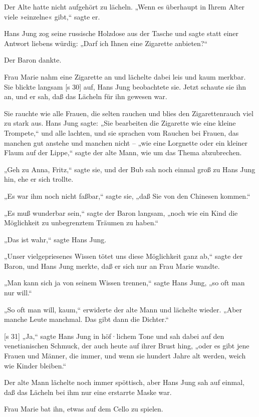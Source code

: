 Der Alte hatte nicht aufgehört zu lächeln.
„Wenn es überhaupt in Ihrem Alter viele »einzelne«
gibt,“ sagte er.

Hans Jung zog seine russische Holzdose aus
der Tasche und sagte statt einer Antwort liebens­
würdig: „Darf ich Ihnen eine Zigarette anbieten?“

Der Baron dankte.

Frau Marie nahm eine Zigarette an und lächelte
dabei leis und kaum merkbar. Sie blickte langsam
[s 30]
auf, Hans Jung beobachtete sie. Jetzt schaute sie ihn
an, und er sah, daß das Lächeln für ihn gewesen war.

Sie rauchte wie alle Frauen, die selten rauchen
und blies den Zigarettenrauch viel zu stark aus.
Hans Jung sagte: „Sie bearbeiten die Zigarette wie
eine kleine Trompete,“ und alle lachten, und sie
sprachen vom Rauchen bei Frauen, das manchen gut
anstehe und manchen nicht – „wie eine Lorgnette
oder ein kleiner Flaum auf der Lippe,“ sagte der
alte Mann, wie um das Thema abzubrechen.

„Geh zu Anna, Fritz,“ sagte sie, und der Bub sah
noch einmal groß zu Hans Jung hin, ehe er sich trollte.

„Es war ihm noch nicht faßbar,“ sagte sie, „daß
Sie von den Chinesen kommen.“

„Es muß wunderbar sein,“ sagte der Baron
langsam, „noch wie ein Kind die Möglichkeit zu
unbegrenztem Träumen zu haben.“

„Das ist wahr,“ sagte Hans Jung.

„Unser vielgepriesenes Wissen tötet uns diese
Möglichkeit ganz ab,“ sagte der Baron, und Hans
Jung merkte, daß er sich nur an Frau Marie wandte.

„Man kann sich ja von seinem Wissen trennen,“
sagte Hans Jung, „so oft man nur will.“

„So oft man will, kaum,“ erwiderte der alte
Mann und lächelte wieder. „Aber manche Leute
manchmal. Das gibt dann die Dichter.“

[s 31]
„Ja,“ sagte Hans Jung in höf·lichem Tone und
sah dabei auf den venetianischen Schmuck, der auch
heute auf ihrer Brust hing, „oder es gibt jene Frauen
und Männer, die immer, und wenn sie hundert Jahre
alt werden, weich wie Kinder bleiben.“

Der alte Mann lächelte noch immer spöttisch,
aber Hans Jung sah auf einmal, daß das Lächeln
bei ihm nur eine erstarrte Maske war.

Frau Marie bat ihn, etwas auf dem Cello zu
spielen.

